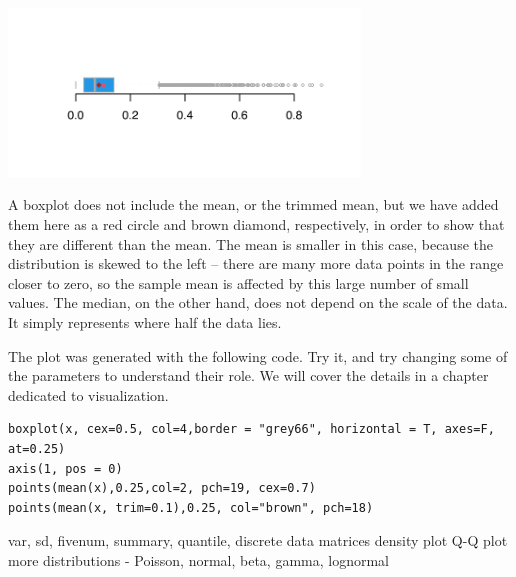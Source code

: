 \documentclass[11pt]{article}
\theoremstyle{definition}
\begin{document}
\begin{center}
\includegraphics[width=0.7\textwidth]{Note01BoxplotExp10}
\end{center}

A boxplot does not include the mean, or the trimmed mean, but we have added them here as a red circle and brown diamond, respectively, in order to show that they are different than the mean. The mean is smaller in this case, because the distribution is skewed to the left -- there are many more data points in the range closer to zero, so the sample mean is affected by this large number of small values. The median, on the other hand, does not depend on the scale of the data. It simply represents where half the data lies. 

The plot was generated with the following code. Try it, and try changing some of the parameters to understand their role. We will cover the details in a chapter dedicated to visualization.
\begin{verbatim}
boxplot(x, cex=0.5, col=4,border = "grey66", horizontal = T, axes=F, at=0.25)
axis(1, pos = 0)
points(mean(x),0.25,col=2, pch=19, cex=0.7)
points(mean(x, trim=0.1),0.25, col="brown", pch=18)
\end{verbatim}



var, sd, fivenum, summary, quantile, 
discrete data
matrices
density plot
Q-Q plot
more distributions - Poisson, normal, beta, gamma, lognormal

\end{document}
